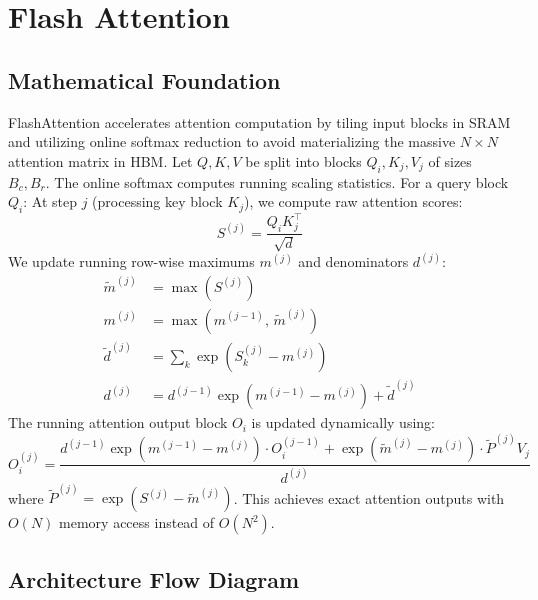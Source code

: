 \newpage
\section{Flash Attention}

\subsection{Mathematical Foundation}
FlashAttention accelerates attention computation by tiling input blocks in SRAM and utilizing online softmax reduction to avoid materializing the massive $N \times N$ attention matrix in HBM.
Let $Q, K, V$ be split into blocks $Q_i, K_j, V_j$ of sizes $B_c, B_r$. The online softmax computes running scaling statistics. For a query block $Q_i$:
At step $j$ (processing key block $K_j$), we compute raw attention scores:
\begin{equation}
  S^{(j)} = \frac{Q_i K_j^\top}{\sqrt{d}}
\end{equation}
We update running row-wise maximums $m^{(j)}$ and denominators $d^{(j)}$:
\begin{align}
  \tilde{m}^{(j)} &= \max(S^{(j)}) \\
  m^{(j)} &= \max(m^{(j-1)}, \, \tilde{m}^{(j)}) \\
  \tilde{d}^{(j)} &= \sum_k \exp(S^{(j)}_k - m^{(j)}) \\
  d^{(j)} &= d^{(j-1)} \exp(m^{(j-1)} - m^{(j)}) + \tilde{d}^{(j)}
\end{align}
The running attention output block $O_i$ is updated dynamically using:
\begin{equation}
  O_i^{(j)} = \frac{d^{(j-1)} \exp(m^{(j-1)} - m^{(j)}) \cdot O_i^{(j-1)} + \exp(\tilde{m}^{(j)} - m^{(j)}) \cdot \tilde{P}^{(j)} V_j}{d^{(j)}}
\end{equation}
where $\tilde{P}^{(j)} = \exp(S^{(j)} - \tilde{m}^{(j)})$. This achieves exact attention outputs with $O(N)$ memory access instead of $O(N^2)$.

\subsection{Architecture Flow Diagram}

